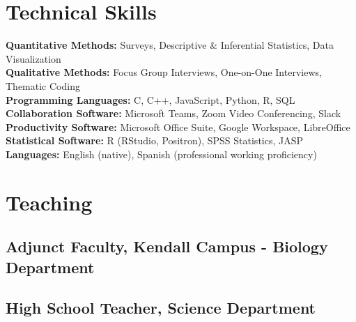 \documentclass[letterpaper,11pt]{article}
\begin{document}
\ifcv
\section*{Technical Skills}

\textbf{Quantitative Methods:} Surveys, Descriptive \& Inferential Statistics, Data Visualization \\
\textbf{Qualitative Methods:} Focus Group Interviews, One-on-One Interviews, Thematic Coding \\
\textbf{Programming Languages:} C, C++, JavaScript, Python, R, SQL \\
\textbf{Collaboration Software:} Microsoft Teams, Zoom Video Conferencing, Slack \\
\textbf{Productivity Software:} Microsoft Office Suite, Google Workspace, LibreOffice \\
\textbf{Statistical Software:} R (RStudio, Positron), SPSS Statistics, JASP \\
\textbf{Languages:} English (native), Spanish (professional working proficiency)
\fi


\ifcv
\section*{Teaching}

\subsection*{Adjunct Faculty, Kendall Campus - Biology Department}
\begin{itemize}
\end{itemize}

\subsection*{High School Teacher, Science Department}
\begin{itemize}
\end{itemize}
\fi
\end{document}
